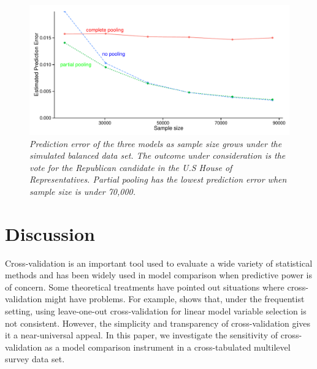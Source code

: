 \documentclass[sii]{ipart}
\begin{document}
\begin{figure}[h]
  \centering
  \includegraphics[width=.45\textwidth]{hourvote_bal.pdf}
  \caption{\em Prediction error of the three models as sample size grows under the
    simulated balanced data set. The outcome under consideration is the vote for
    the Republican candidate in the U.S House of Representatives. Partial
    pooling has the lowest prediction error when sample size is under 70,000.}
  \label{fig:hourvote_bal}
\end{figure} 





\section{Discussion}
Cross-validation is an important tool used to evaluate a wide variety of
statistical methods and has been widely used in model comparison when predictive
power is of concern. Some theoretical treatments have pointed out situations
where cross-validation might have problems. For example, \citet{shao1993linear}
shows that, under the frequentist setting, using leave-one-out cross-validation for
linear model variable selection is not consistent. %
However, the simplicity and transparency of cross-validation gives it a near-universal
appeal. In this paper, we investigate the
sensitivity of cross-validation as a model comparison instrument in a
cross-tabulated multilevel survey data set.
\end{document}
